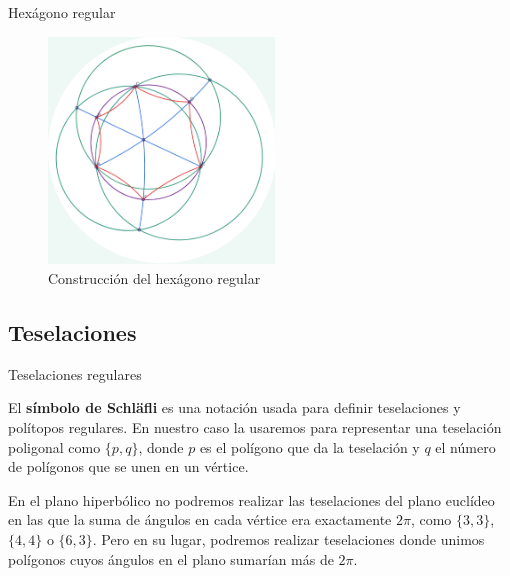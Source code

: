 \documentclass[compress]{beamer}
\begin{document}
\begin{frame}{Hexágono regular}
  \begin{figure}[ht!]
    \centering
    \includegraphics[width=60mm]{./hexagon.png}
    \caption{Construcción del hexágono regular \label{hexagon}}
  \end{figure}
\end{frame}


\subsection{Teselaciones}

\begin{frame}{Teselaciones regulares}
\begin{definition}
  El \textbf{símbolo de Schläfli} es una notación usada para definir
  teselaciones y polítopos regulares. En nuestro caso la usaremos para
  representar una teselación poligonal como $\{p,q\}$, donde $p$ es el
  polígono que da la teselación y $q$ el número de polígonos que se unen
  en un vértice.
\end{definition}

En el plano hiperbólico no podremos realizar las teselaciones del
plano euclídeo en las que la suma de ángulos en cada vértice era
exactamente $2\pi$, como $\{3,3\}$, $\{4,4\}$ o $\{6,3\}$. Pero en su
lugar, podremos realizar teselaciones donde unimos polígonos cuyos
ángulos en el plano sumarían más de $2\pi$.
\end{frame}
\end{document}
